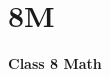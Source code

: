 \label{2 C8 Math}
    \section{8M}
    \begin{frame}
    \begin{center}
    \begin{Huge}
        \textbf{Class 8 Math}
    \end{Huge}
    \end{center}
    \end{frame}
 
    
